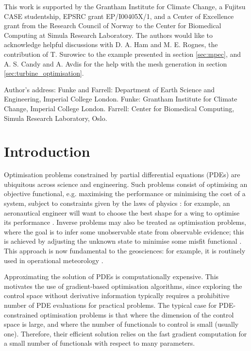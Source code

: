 \documentclass[prodmode,acmtoms]{acmsmall}
\begin{document}
\begin{bottomstuff}
This work is supported by the Grantham Institute for Climate Change, a Fujitsu CASE studentship, EPSRC grant EP/I00405X/1, and a Center of Excellence grant from the Research
Council of Norway to the Center for Biomedical Computing at Simula Research Laboratory. 
The authors would like to acknowledge helpful discussions with D. A. Ham and M. E. Rognes, 
the contribution of T. Surowiec to the example presented in section \ref{sec:mpec}, and 
A. S. Candy and A. Avdis for the help with the mesh generation in section \ref{sec:turbine_optimisation}.

Author's address: Funke and Farrell: Department of Earth Science and Engineering, Imperial College London. 
Funke: Grantham Institute for Climate Change, Imperial College London.
Farrell: Center for Biomedical Computing, Simula Research Laboratory, Oslo.
\end{bottomstuff}

\maketitle

\section{Introduction}\label{sec:introduction}

Optimisation problems constrained by partial differential equations (PDEs) are ubiquitous across science
and engineering. Such problems consist of optimising an objective functional, e.g. maximising the performance or
minimising the cost of a system, subject to constraints given by the laws of physics \cite{lions1971}: for example,
an aeronautical engineer will want to choose the best shape for a wing to optimise its performance
\cite{jameson1988}. Inverse problems may also be treated as optimisation problems, where
the goal is to infer some unobservable state from observable evidence; this is achieved by adjusting
the unknown state to minimise some misfit functional \cite{ledimet1986}. This approach is now
fundamental to the geosciences: for example, it is routinely used in operational meteorology \cite{rabier2000}.

Approximating the solution of PDEs is computationally expensive. This motivates the use of gradient-based optimisation
algorithms, since exploring the control space without derivative information typically requires a
prohibitive number of PDE evaluations for practical problems.
The typical case for PDE-constrained optimisation problems is that where the dimension of the
control space is large, and where the number of functionals to control is small (usually one).
Therefore, their efficient solution relies on the fast gradient computation for a small number of functionals with respect to many parameters.
\end{document}
